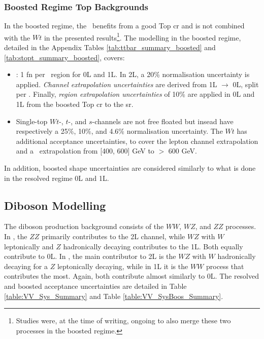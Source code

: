 \subsubsection{Boosted Regime Top Backgrounds} 
In the boosted regime, the \ttb\ benefits from a good Top \gls{cr} and is not combined with the $Wt$ in the presented results\footnote{Studies were, at the time of writing, ongoing to also merge these two processes in the boosted regime.}. The modelling in the boosted regime, detailed in the Appendix Tables \ref{tab:ttbar_summary_boosted} and \ref{tab:stopt_summary_boosted}, covers:
\begin{itemize}[leftmargin=*]
    \item \ttb: 1 \gls{fn} per \ptv\ region for 0L and 1L. In 2L, a 20\% normalisation uncertainty is applied. \textit{Channel extrapolation uncertainties} are derived from 1L $\rightarrow$ 0L, split per \ptv. Finally, \textit{region extrapolation uncertainties} of 10\% are applied in 0L and 1L from the boosted Top \gls{cr} to the \gls{sr}.
    \item Single-top $Wt$-, $t$-, and $s$-channels are not free floated but insead have respectively a 25\%, 10\%, and 4.6\% normalisation uncertainty. The $Wt$ has additional acceptance uncertainties, to cover the lepton channel extrapolation and a \ptv\ extrapolation from [400, 600] GeV to $>$ 600 GeV. 
\end{itemize}
In addition, boosted shape uncertainties are considered similarly to what is done in the resolved regime 0L and 1L.

\subsection{Diboson Modelling}
The diboson production background consists of the $WW$, $WZ$, and $ZZ$ processes. In \vhb, the $ZZ$ primarily contributes to the 2L channel, while $WZ$ with $W$ leptonically and $Z$ hadronically decaying contributes to the 1L. Both equally contribute to 0L. In \vhc, the main contributor to 2L is the $WZ$ with $W$ hadronically decaying for a $Z$ leptonically decaying, while in 1L it is the $WW$ process that contributes the most. Again, both contribute almost similarly to 0L. The resolved and boosted acceptance uncertainties are detailed in Table \ref{table:VV_Sys_Summary} and Table \ref{table:VV_SysBoos_Summary}. \\

